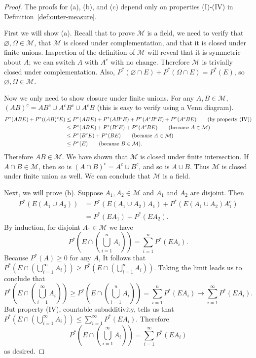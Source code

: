 \documentclass[11pt,fleqn]{book} %
\begin{document}
\begin{proof}
	The proofs for (a), (b), and (c) depend only on properties (I)-(IV) in Definition~\ref{def:outer-measure}.

	\vspace{10pt}
	First we will show (a). Recall that to prove $\mathcal{M}$ is a field, we need to verify that $\varnothing, \Omega \in \mathcal{M}$, that $\mathcal{M}$ is closed under complementation, and that it is closed under finite unions. Inspection of the definition of $\mathcal{M}$ will reveal that it is symmetric about $A$; we can switch $A$ with $A^c$ with no change. Therefore $\mathcal{M}$ is trivially closed under complementation. Also, $P^*(\varnothing \cap E) + P^*(\Omega \cap E) = P^*(E)$, so $\varnothing, \Omega \in \mathcal{M}$.

	Now we only need to show closure under finite unions. For any $A,B \in \mathcal{M}$, $(AB)^c = AB^c \cup A^cB^c \cup A^cB$ (this is easy to verify using a Venn diagram).
	\begin{align*}
		P^*(ABE) + P^*((AB)^cE) &\leq P^*(ABE) + P^*(AB^cE) + P^*(A^cB^cE) + P^*(A^cBE) \tag{by property (IV)} \\
		&\leq P^*(ABE) + P^*(B^cE) + P^*(A^cBE) \tag{because $A \in \mathcal{M}$} \\
		&\leq P^*(B^cE) + P^*(BE) \tag{because $A \in \mathcal{M}$} \\
		&\leq P^*(E) \tag{because $B \in \mathcal{M}$}.
	\end{align*}
	Therefore $AB \in \mathcal{M}$. We have shown that $\mathcal{M}$ is closed under finite intersection. If $A \cap B \in \mathcal{M}$, then so is $(A \cap B)^c = A^c \cup B^c$, and so is $A \cup B$. Thus $\mathcal{M}$ is closed under finite union as well. We can conclude that $\mathcal{M}$ is a field.

	\vspace{10pt}
	Next, we will prove (b). Suppose $A_1,A_2 \in \mathcal{M}$ and $A_1$ and $A_2$ are disjoint. Then
	\begin{align*}
		P^*(E(A_1 \cup A_2)) &= P^*(E(A_1 \cup A_2)A_1) + P^*(E(A_1 \cup A_2)A_1^c) \\
		&= P^*(EA_1)+P^*(EA_2) \tag{because $A_2 \subset A_1^c$}.
	\end{align*}
	By induction, for disjoint $A_1 \in \mathcal{M}$ we have
	\[
		P^*\left( E \cap \left( \bigcup_{i=1}^n A_i \right) \right) = \sum_{i=1}^n P^*(EA_i).
	\]
	Because $P^*(A) \geq 0$ for any $A$, It follows that $P^*(E \cap (\bigcup_{i=1}^\infty A_i)) \geq P^*(E \cap (\bigcup_{i=1}^n A_i))$. Taking the limit leads us to conclude that 
	\[
		P^* \left( E \cap \left( \bigcup_{i=1}^\infty A_i \right) \right) \geq P^*\left( E \cap \left( \bigcup_{i=1}^n A_i \right) \right) = \sum_{i=1}^n P^*(EA_i) \rightarrow \sum_{i=1}^\infty P^*(EA_i).
	\]
	But property (IV), countable subadditivity, tells us that $P^*(E \cap (\bigcup_{i=1}^\infty A_i)) \leq \sum_{i=1}^\infty P^*(EA_i)$. Therefore
	\[
		P^* \left( E \cap \left( \bigcup_{i=1}^\infty A_i \right) \right) = \sum_{i=1}^\infty P^*(EA_i)
	\]
	as desired.


\end{proof}
\end{document}
